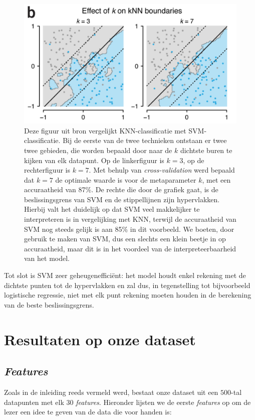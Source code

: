 \documentclass[twoside, kulak]{kulakreport}
\begin{document}
	\begin{figure}
		\centering
		\includegraphics[width=.6\textwidth]{KNN-vs-SVM.PNG}
		\caption{Deze figuur uit bron \cite{bzdok2018machine} vergelijkt KNN-classificatie met SVM-classificatie. Bij de eerste van de twee technieken ontstaan er twee twee gebieden, die worden bepaald door naar de \(k\) dichtste buren te kijken van elk datapunt. Op de linkerfiguur is \(k=3\), op de rechterfiguur is \(k=7\). Met behulp van \textit{cross-validation} werd bepaald dat \(k=7\) de optimale waarde is voor de metaparameter \(k\), met een accuraatheid van 87\%. De rechte die door de grafiek gaat, is de beslissingsgrens van SVM en de stippellijnen zijn hypervlakken. Hierbij valt het duidelijk op dat SVM veel makkelijker te interpreteren is in vergelijking met KNN, terwijl de accuraatheid van SVM nog steeds gelijk is aan 85\% in dit voorbeeld. We boeten, door gebruik te maken van SVM, dus een slechts een klein beetje in op accuraatheid, maar dit is in het voordeel van de interpreteerbaarheid van het model.}
		\label{fig:KNNvsSVM}
	\end{figure}
	
	Tot slot is SVM zeer geheugenefficiënt: het model houdt enkel rekening met de dichtste punten tot de hypervlakken en zal dus, in tegenstelling tot bijvoorbeeld logistische regressie, niet met elk punt rekening moeten houden in de berekening van de beste beslissingsgrens.
	
	\chapter{Resultaten op onze dataset}
	
	\section{\textit{Features}}
	
	Zoals in de inleiding reeds vermeld werd, bestaat onze dataset uit een \(500\)-tal datapunten met elk \(30\) \textit{features}. Hieronder lijsten we de eerste \textit{features} op om de lezer een idee te geven van de data die voor handen is:
	
\end{document}
